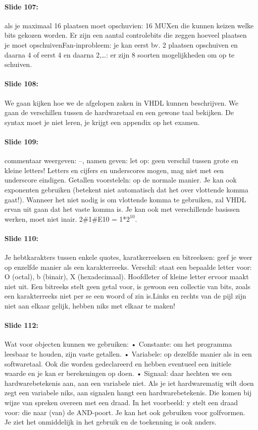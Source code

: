 \documentclass[10pt,a4paper]{book}
\begin{document}
\paragraph{Slide 107:} als je maximaal 16 plaatsen moet opschuvien: 16 MUXen die kunnen keizen welke bits gekozen worden. Er zijn een aantal controlebits die zeggen hoeveel plaatsen je moet opschuivenFan-inprobleem: je kan eerst bv. 2 plaatsen opschuiven en daarna 4 of eerst 4 en daarna 2,\ldots: er zijn 8 soorten mogelijkheden om op te schuiven.

\paragraph{Slide 108:} We gaan kijken hoe we de afgelopen zaken in VHDL kunnen beschrijven. We gaan de verschillen tussen de hardwaretaal en een gewone taal bekijken. De syntax moet je niet leren, je krijgt een appendix op het examen. 

\paragraph{Slide 109:} commentaar weergeven: --, namen geven: let op: geen verschil tussen grote en kleine letters! Letters en cijfers en underscores mogen, mag niet met een underscore eindigen. Getallen voorsteleln: op de normale manier. Je kan ook exponenten gebruiken (betekent niet automatisch dat het over vlottende komma gaat!). Wanneer het niet nodig is om vlottende komma te gebruiken, zal VHDL ervan uit gaan dat het vaste komma is. Je kan ook met verschillende basissen werken, moet niet inair. 2\#1\#E10 = 1*$2^10$.

\paragraph{Slide 110:} Je hebtkarakters tussen enkele quotes, karatkerreeksen en bitreeksen: geef je weer op enzelfde manier als een karakterreeks. Verschil: staat een bepaalde letter voor: O (octal), b (binair), X (hexadecimaal). Hoofdleter of kleine letter ervoor maakt niet uit. Een bitreeks stelt geen getal voor, is gewoon een collectie van bits, zoals een karakterreeks niet per se een woord of zin is.Links en rechts van de pijl zijn niet aan elkaar gelijk, hebben niks met elkaar te maken!

\paragraph{Slide 112:} Wat voor objecten kunnen we gebruiken:	• Constante: om het programma leesbaar te houden, zijn vaste getallen. 	• Variabele: op dezelfde manier als in een softwaretaal. Ook die worden gedeclareerd en hebben eventueel een initiele waarde en je kan er berekeningen op doen. 	• Signaal: daar hechten we een hardwarebetekenis aan, aan een variabele niet. Als je iet hardwarematig wilt doen zegt een variabele niks, aan signalen hangt een hardwarebetekenis. Die komen bij wijze van spreken overeen met een draad. In het voorbeeld: y stelt een draad voor: die naar (van) de AND-poort. Je kan het ook gebruiken voor golfvormen. Je ziet het onmiddelijk in het gebruik en de toekenning is ook anders. 
\end{document}
